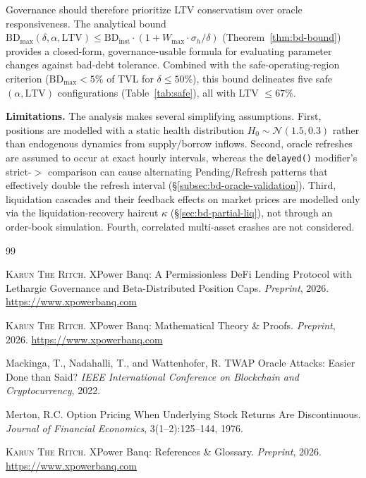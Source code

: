\documentclass[10pt,a4paper,twocolumn]{article}
\begin{document}
Governance should therefore prioritize LTV conservatism over oracle responsiveness. The analytical bound $\text{BD}_{\max}(\delta, \alpha, \text{LTV}) \leq \text{BD}_{\text{inst}} \cdot (1 + W_{\max} \cdot \sigma_h / \delta)$ (Theorem~\ref{thm:bd-bound}) provides a closed-form, governance-usable formula for evaluating parameter changes against bad-debt tolerance. Combined with the safe-operating-region criterion ($\text{BD}_{\max} < 5\%$ of TVL for $\delta \leq 50\%$), this bound delineates five safe $(\alpha, \text{LTV})$ configurations (Table~\ref{tab:safe}), all with LTV $\leq 67\%$.

\textbf{Limitations.} The analysis makes several simplifying assumptions. First, positions are modelled with a static health distribution $H_0 \sim \mathcal{N}(1.5, 0.3)$ rather than endogenous dynamics from supply/borrow inflows. Second, oracle refreshes are assumed to occur at exact hourly intervals, whereas the \texttt{delayed()} modifier's strict-$>$ comparison can cause alternating Pending/Refresh patterns that effectively double the refresh interval (\S\ref{subsec:bd-oracle-validation}). Third, liquidation cascades and their feedback effects on market prices are modelled only via the liquidation-recovery haircut $\kappa$ (\S\ref{sec:bd-partial-liq}), not through an order-book simulation. Fourth, correlated multi-asset crashes are not considered.




\ifbundle\else
\begin{thebibliography}{99}

\textsc{Karun The Ritch}.
\newblock XPower Banq: A Permissionless DeFi Lending Protocol with Lethargic Governance and Beta-Distributed Position Caps.
\newblock \emph{Preprint}, 2026.
\newblock \url{https://www.xpowerbanq.com}

\textsc{Karun The Ritch}.
\newblock XPower Banq: Mathematical Theory \& Proofs.
\newblock \emph{Preprint}, 2026.
\newblock \url{https://www.xpowerbanq.com}

Mackinga, T., Nadahalli, T., and Wattenhofer, R.
\newblock TWAP Oracle Attacks: Easier Done than Said?
\newblock \emph{IEEE International Conference on Blockchain and Cryptocurrency}, 2022.

Merton, R.C.
\newblock Option Pricing When Underlying Stock Returns Are Discontinuous.
\newblock \emph{Journal of Financial Economics}, 3(1--2):125--144, 1976.

\textsc{Karun The Ritch}.
\newblock XPower Banq: References \& Glossary.
\newblock \emph{Preprint}, 2026.
\newblock \url{https://www.xpowerbanq.com}

\end{thebibliography}
\fi
\end{document}
